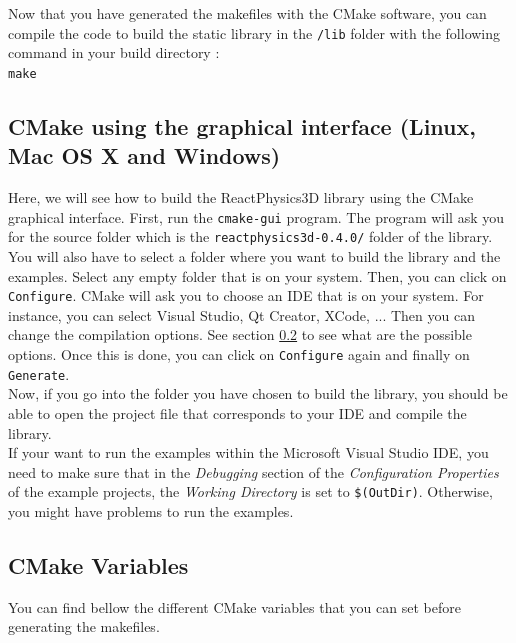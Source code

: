 \documentclass[a4paper,12pt]{article}
\begin{document}
    Now that you have generated the makefiles with the CMake software, you can compile the code to build the static library in the
    \texttt{/lib} folder with the following command in your build directory : \\
    
    \texttt{make}

    \subsection{CMake using the graphical interface (Linux, Mac OS X and Windows)}

     Here, we will see how to build the ReactPhysics3D library using the CMake graphical interface. 
     First, run the \texttt{cmake-gui} program. The program will ask you for the
     source folder which is the \texttt{reactphysics3d-0.4.0/} folder of
     the library. You will also have to select a folder where you want to
     build the library and the examples. Select any empty folder that
     is on your system. Then, you can click on \texttt{Configure}. CMake will ask you to choose an IDE that is on
     your system. For instance, you can select Visual Studio, Qt Creator, XCode, ... Then you
     can change the compilation options. See section \ref{sec:cmakevariables} to see what are the possible options.
     Once this is done, you can click on \texttt{Configure} again and finally on \texttt{Generate}. \\ 
    
     Now, if you go into the folder you have chosen to build the
     library, you should be able to open the project file that corresponds to your IDE and compile
     the library. \\

     If your want to run the examples within the Microsoft Visual Studio IDE, you need to make sure that in the
     \emph{Debugging} section of the \emph{Configuration Properties} of the example projects, the \emph{Working Directory} is set to \texttt{\$(OutDir)}.
     Otherwise, you might have problems to run the examples.

     \subsection{CMake Variables}
     \label{sec:cmakevariables}

     You can find bellow the different CMake variables that you can set before generating the makefiles.
\end{document}
